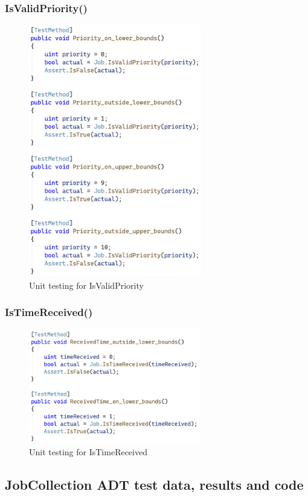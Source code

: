 \documentclass[a4paper]{article}
\begin{document}
\subsubsection{IsValidPriority{()}}
\begin{figure}[H]
   \includegraphics[height=11cm]{images/IsValidPriority.png}
   \caption{Unit testing for IsValidPriority}
\end{figure}

\subsubsection{IsTimeReceived{()}}
\begin{figure}[H]
   \includegraphics[height=5cm]{images/IsTimeReceived.png}
   \caption{Unit testing for IsTimeReceived}
\end{figure}


\subsection{JobCollection ADT test data, results and code}
\end{document}
